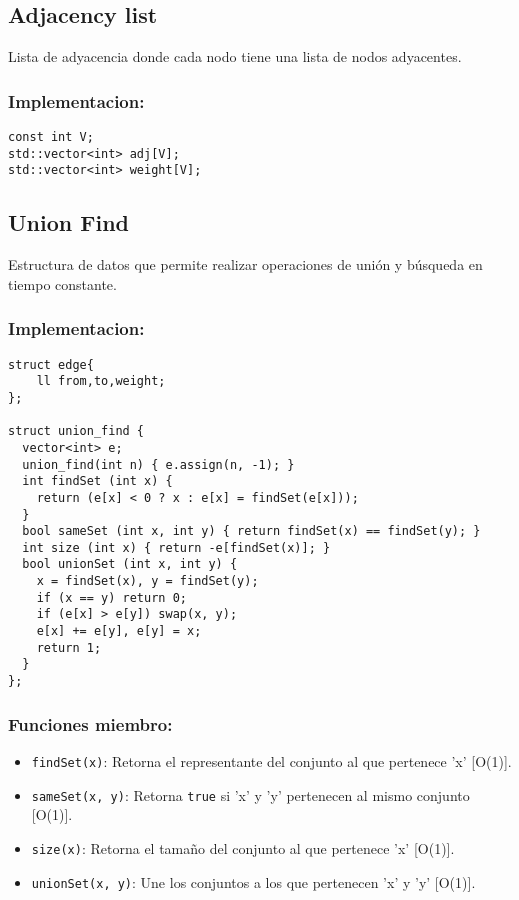 \subsection{Adjacency list}
\label{subsec:adjacency_list}
Lista de adyacencia donde cada nodo tiene una lista de nodos adyacentes.

\subsubsection{Implementacion:}
\begin{lstlisting}
const int V;
std::vector<int> adj[V];
std::vector<int> weight[V];
\end{lstlisting}

\subsection{Union Find}
\label{subsec:union_find}
Estructura de datos que permite realizar operaciones de unión y búsqueda en tiempo constante. 

\subsubsection{Implementacion:}
\begin{lstlisting}
struct edge{
    ll from,to,weight;
};

struct union_find {
  vector<int> e;
  union_find(int n) { e.assign(n, -1); }
  int findSet (int x) { 
    return (e[x] < 0 ? x : e[x] = findSet(e[x]));
  }
  bool sameSet (int x, int y) { return findSet(x) == findSet(y); }
  int size (int x) { return -e[findSet(x)]; }
  bool unionSet (int x, int y) {
    x = findSet(x), y = findSet(y);
    if (x == y) return 0;
    if (e[x] > e[y]) swap(x, y);
    e[x] += e[y], e[y] = x;
    return 1;
  }
};
\end{lstlisting}

\subsubsection{Funciones miembro:}
\begin{itemize}
  \item \texttt{findSet(x)}: Retorna el representante del conjunto al que pertenece 'x' [O(1)].
  \item \texttt{sameSet(x, y)}: Retorna \texttt{true} si 'x' y 'y' pertenecen al mismo conjunto [O(1)].
  \item \texttt{size(x)}: Retorna el tamaño del conjunto al que pertenece 'x' [O(1)].
  \item \texttt{unionSet(x, y)}: Une los conjuntos a los que pertenecen 'x' y 'y' [O(1)].
\end{itemize}

